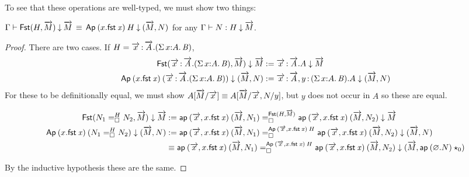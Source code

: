 To see that these operations are well-typed, we must show two things:


\begin{lem}
$\deqdepglob\Gamma{\Fstsigma H{\tel M}}{\tel M}{\Ap{(x.\fst x)}H}{(\tel M,N)}$ for any
$\ofdepglob\Gamma NH{\tel M}$.
\end{lem}
\begin{proof}
There are two cases. If $H=\teltm xA.(\sigmacl xAB)$,
\[\begin{aligned}
\Fstsigma{\teltm xA.(\sigmacl xAB)}{\tel M}\downarrow\tel M
&:= \teltm xA.A\downarrow\tel M \\
\Ap{(x.\fst x)}{(\teltm xA.(\sigmacl xAB))}\downarrow(\tel M,N)
&:= \teltm xA,\tptm y{(\sigmacl xAB)}.A \downarrow(\tel M,N)
\end{aligned}\]
For these to be definitionally equal, we must show $A[\tel M/\tel x]\equiv
A[\tel M/\tel x,N/y]$, but $y$ does not occur in $A$ so these are equal.
\begin{small}\[\begin{aligned}
\Fstsigma{\dhomj H{N_1}{N_2}\blank}{\tel M}\downarrow\tel M
&:= \dhomj{\Fstsigma H{\tel M}}{\ap{(\tel x,x.\fst x)}{(\tel M,N_1)}}{\ap{(\tel
x,x.\fst x)}{(\tel M,N_2)}}{\blank}
\downarrow \tel M \\
\Ap{(x.\fst x)}{(\dhomj H{N_1}{N_2}\blank)}\downarrow(\tel M,N)
&:= \dhomj{\Ap{(\tel x,x.\fst x)} H}{\ap{(\tel x,x.\fst x)}{(\tel
M,N_1)}}{\ap{(\tel x,x.\fst x)}{(\tel M,N_2)}}{\blank}
\downarrow (\tel M,N) \\
&\equiv \dhomj{\Ap{(\tel x,x.\fst x)} H}{\ap{(\tel x,x.\fst x)}{(\tel
M,N_1)}}{\ap{(\tel x,x.\fst x)}{(\tel M,N_2)}}{\blank}
\downarrow (\tel M,\ap{(\emptytel.N)}{\unitglobelt 0})
\end{aligned}\]\end{small}
By the inductive hypothesis these are the same.
\end{proof}

